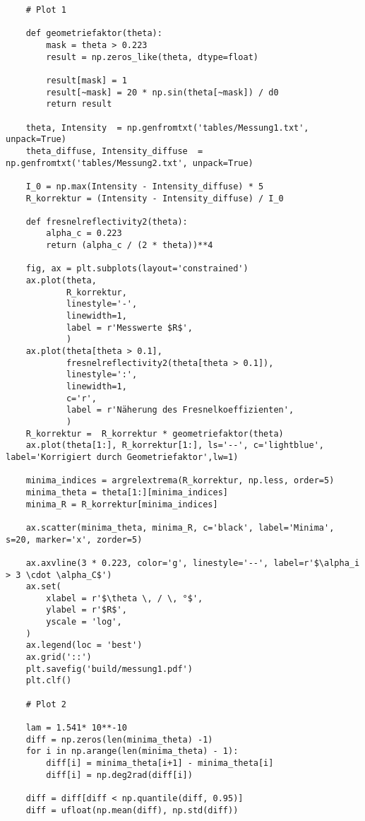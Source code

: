 \begin{lstlisting}
    # Plot 1

    def geometriefaktor(theta):
        mask = theta > 0.223
        result = np.zeros_like(theta, dtype=float)
    
        result[mask] = 1
        result[~mask] = 20 * np.sin(theta[~mask]) / d0
        return result
    
    theta, Intensity  = np.genfromtxt('tables/Messung1.txt', unpack=True)
    theta_diffuse, Intensity_diffuse  = np.genfromtxt('tables/Messung2.txt', unpack=True)
    
    I_0 = np.max(Intensity - Intensity_diffuse) * 5         
    R_korrektur = (Intensity - Intensity_diffuse) / I_0
        
    def fresnelreflectivity2(theta):
        alpha_c = 0.223
        return (alpha_c / (2 * theta))**4
    
    fig, ax = plt.subplots(layout='constrained')
    ax.plot(theta,
            R_korrektur,
            linestyle='-',
            linewidth=1,
            label = r'Messwerte $R$',
            )
    ax.plot(theta[theta > 0.1],
            fresnelreflectivity2(theta[theta > 0.1]),
            linestyle=':',
            linewidth=1,
            c='r',
            label = r'Näherung des Fresnelkoeffizienten',
            )
    R_korrektur =  R_korrektur * geometriefaktor(theta)
    ax.plot(theta[1:], R_korrektur[1:], ls='--', c='lightblue', label='Korrigiert durch Geometriefaktor',lw=1)
    
    minima_indices = argrelextrema(R_korrektur, np.less, order=5)
    minima_theta = theta[1:][minima_indices]
    minima_R = R_korrektur[minima_indices]
    
    ax.scatter(minima_theta, minima_R, c='black', label='Minima', s=20, marker='x', zorder=5)
    
    ax.axvline(3 * 0.223, color='g', linestyle='--', label=r'$\alpha_i > 3 \cdot \alpha_C$')
    ax.set(
        xlabel = r'$\theta \, / \, °$',
        ylabel = r'$R$',
        yscale = 'log',
    )
    ax.legend(loc = 'best')
    ax.grid('::')
    plt.savefig('build/messung1.pdf')
    plt.clf()
    
    # Plot 2
    
    lam = 1.541* 10**-10
    diff = np.zeros(len(minima_theta) -1)
    for i in np.arange(len(minima_theta) - 1):
        diff[i] = minima_theta[i+1] - minima_theta[i]
        diff[i] = np.deg2rad(diff[i])
    
    diff = diff[diff < np.quantile(diff, 0.95)]
    diff = ufloat(np.mean(diff), np.std(diff))
    

\end{lstlisting}

